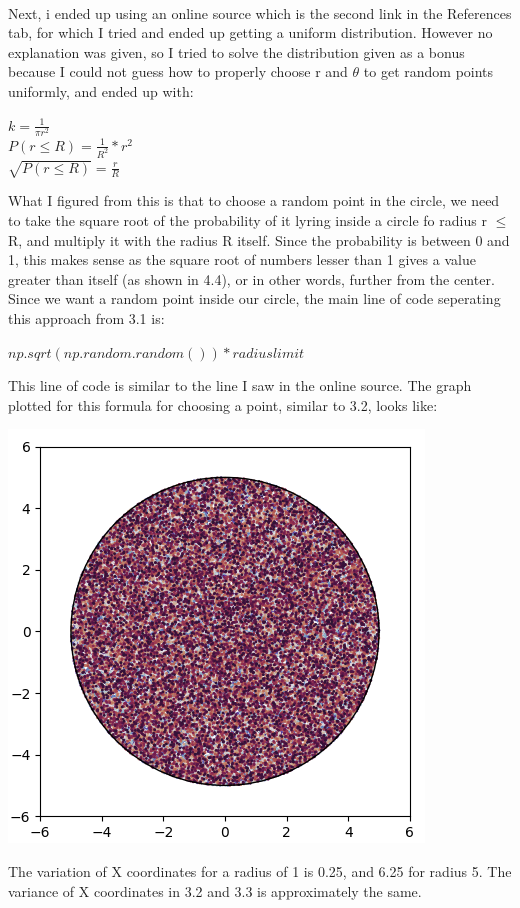 \documentclass[addpoints]{exam}
\begin{document}
\begin{questions}
\\
Next, i ended up using an online source which is the second link in the References tab, for which I tried and ended up getting a uniform distribution. However no explanation was given, so I tried to solve the distribution given as a bonus because I could not guess how to properly choose r and $\theta$ to get random points uniformly, and ended up with:\\
\begin{center}
$k = \frac{1}{\pi r^2} $\\
$P(r \leq R) = \frac{1}{R^2}*r^2$\\
$\sqrt{P(r \leq R)} = \frac{r}{R}$\\
\end{center}
What I figured from this is that to choose a random point in the circle, we need to take the square root of the probability of it lyring inside a circle fo radius r $\leq$ R, and multiply it with the radius R itself. Since the probability is between 0 and 1, this makes sense as the square root of numbers lesser than 1 gives a value greater than itself (as shown in 4.4), or in other words, further from the center. Since we want a random point inside our circle, the main line of code seperating this approach from 3.1 is:\\
\begin{center}
$np.sqrt(np.random.random()) * radiuslimit$\\
\end{center}
This line of code is similar to the line I saw in the online source. The graph plotted for this formula for choosing a point, similar to 3.2, looks like:\\
\begin{center}
\includegraphics[width=.48\textwidth]{images/p3_3.png}
\end{center}

The variation of X coordinates for a radius of 1 is 0.25, and 6.25 for radius 5. The variance of X coordinates in 3.2 and 3.3 is approximately the same.

\end{questions}
\end{document}
